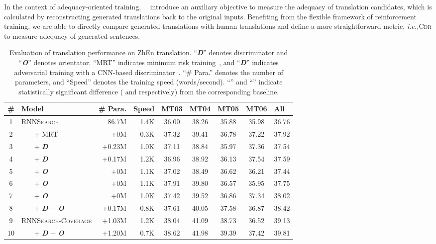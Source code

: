 \documentclass[letterpaper]{article} \usepackage{aaai19}  \usepackage{times}  \usepackage{helvet}  \usepackage{courier}  \usepackage{url}  \usepackage{graphicx}  \frenchspacing  \setlength{\pdfpagewidth}{8.5in}  \setlength{\pdfpageheight}{11in}  \usepackage{amsmath}
\begin{document}
In the context of adequacy-oriented training,~\citeauthor{Tu:2017:AAAI}~ introduce an auxiliary objective to measure the adequacy of translation candidates, which is calculated by reconstructing generated translations back to the original inputs. Benefiting from the flexible framework of reinforcement training, we are able to directly compare generated translations with human translations and define a more straightforward metric, \emph{i.e.,}\xspace \textsc{Cdr} to measure adequacy of generated sentences.


\begin{table*}[t]
  \centering
  
\begin{tabular}{c|l||r r||cccc|l}\bf \#  &   \bf Model &\bf \# Para. & \bf Speed &  \bf  MT03 & \bf MT04 & \bf MT05 & \bf MT06 &  \bf All \\\hline
    1   &   \textsc{RNNSearch} & 86.7M & 1.4K  & 36.00 & 38.26 &35.88 & 35.98 & 36.76   \\ 2 & ~~~ + MRT & +0M & 0.3K & 37.32 & 39.41 & 36.78 & 37.22 & 37.92  \\
    \hline
    3   &   ~~~ + {\bf \em D}	& +0.23M & 1.0K &  37.11 & 38.84 & 35.97&37.36 &37.54 \\ 4   &   ~~~ + {\bf \em D}	& +0.17M & 1.2K &36.96 & 38.92 & 36.13 & 37.54 & 37.59  \\ \hline
    5   &   ~~~ + {\bf \em O} & +0M & 1.1K& 37.02&38.49&36.62&36.21& 37.44 \\
    6   &   ~~~ + {\bf \em O} & +0M & 1.1K& 37.91&39.80&36.57&35.95& 37.75 \\
    7   &   ~~~ + {\bf \em O} & +0M & 1.0K	& 37.42&39.52&36.86&37.34& 38.02\\ \hline
8   &   ~~~ + {\bf \em D} + {\bf \em O} & +0.17M & 0.8K & 37.61&40.05&37.58&36.87 &  38.42\\\hline \hline
    9   &   \textsc{RNNSearch-Coverage} &  +1.03M   & 1.2K  &   38.04   & 41.09 &   38.73 &   36.52   & 39.13  \\
    10   &   ~~~ + {\bf \em D} + {\bf \em O}  &  +1.20M   &  0.7K & 38.62   &   41.98   &   39.39   &   37.42   & 39.81\\
    
\end{tabular}
  \caption{Evaluation of translation performance on ZhEn translation. ``{\bf \em D}'' denotes discriminator and ``{\bf \em O}'' denotes orientator. ``{MRT}'' indicates minimum risk training~\cite{Shen:2016:ACL}, and ``{\bf \em D}'' indicates adversarial training with a CNN-based discriminator~\cite{wu2017adversarial}.
``\# Para.'' denotes the number of parameters, and ``Speed'' denotes the training speed (words/second). ``'' and ``'' indicate statistically significant difference ( and  respectively) from the corresponding baseline.} \label{tab:res} 
\end{table*}
\end{document}
